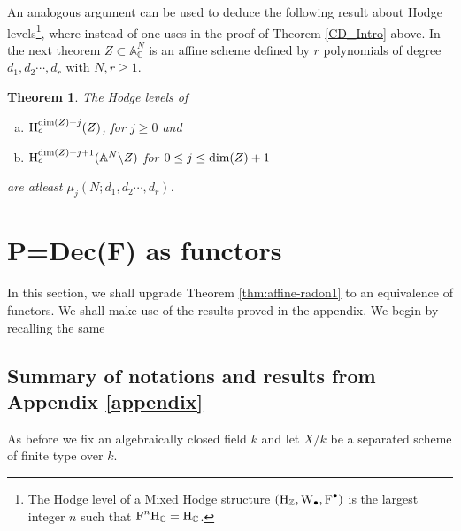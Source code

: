 \documentclass[12pt, reqno]{amsart}
\theoremstyle{plain}
\newtheorem{thm}{\bf Theorem}[subsection]
\theoremstyle{definition}
\theoremstyle{definition}
\newcommand{\bbA}{{\mathbb A}}
\newcommand{\bbC}{{\mathbb C}}
\newcommand{\bbZ}{{\mathbb Z}}
\newcommand{\rH}{{\rm H}}
\begin{document}
An analogous argument can be used to deduce the following result about Hodge levels\footnote{The Hodge level of a Mixed Hodge structure $(\rH_{\bbZ},\textup{W}_{\bullet},\textup{F}^{\bullet})$ is the largest integer $n$ such that $\textup{F}^n\rH_{\bbC}=\rH_{\bbC}$.}, where instead of \cite[Theorem 2.3, (1)]{EK05}  one uses \cite[\S 5.3]{EK05} in the proof of Theorem \ref{CD_Intro} above. In the next theorem $Z \subset \bbA^N_{\bbC}$ is an affine scheme defined by $r$ polynomials of degree $d_1,d_2 \cdots, d_r$ with $N,r \geq 1$.
\begin{thm}\label{HL}
    The Hodge levels of
\begin{enumerate}[(a)]
    \item $\rH_c^{\textup{dim}(Z)+j}(Z)$, for $j\geq 0$ and 
    \item $\rH_c^{\textup{dim}(Z)+j+1}(\bbA^N\backslash Z)$ for $0 \leq j \leq \textup{dim}(Z)+1$
\end{enumerate}
    \noindent are atleast $\mu_j(N;d_1,d_2 \cdots,d_r)$.
\end{thm}

\section{P=Dec(F) as functors}\label{P_Dec_F_Functors}
In this section, we shall upgrade Theorem \ref{thm:affine-radon1} to an equivalence of functors. We shall make use of the results proved in the appendix. We begin by recalling the same

\subsection{Summary of notations and results from Appendix \ref{appendix}}\label{appendixrecall}
As before we fix an algebraically closed field $k$ and let $X/k$ be a separated scheme of finite type over $k$.
\end{document}

